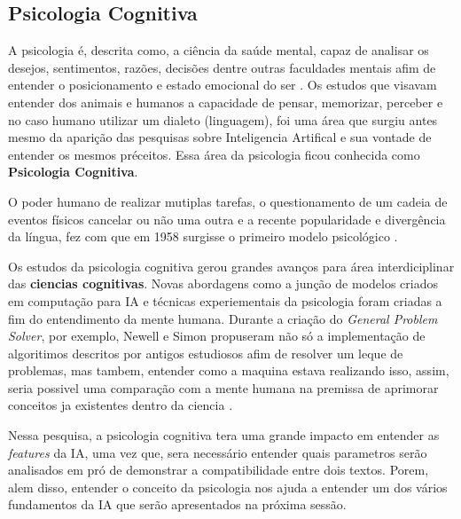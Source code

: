 \subsection{Psicologia Cognitiva}
A psicologia é, descrita como, a ciência da saúde mental, capaz de analisar os desejos, sentimentos, razões, decisões dentre outras faculdades mentais afim de entender o posicionamento e estado emocional do ser \cite[4-6]{william1890principles}. Os estudos que visavam entender dos animais e humanos a capacidade de pensar, memorizar, perceber e no caso humano utilizar um dialeto (linguagem), foi uma área que surgiu antes mesmo da aparição das pesquisas sobre Inteligencia Artifical e sua vontade de entender os mesmos préceitos. Essa área da psicologia ficou conhecida como \textbf{Psicologia Cognitiva}.

O poder humano de realizar mutiplas tarefas, o questionamento de um cadeia de eventos físicos cancelar ou não uma outra e a recente popularidade e divergência da língua, fez com que em 1958 surgisse o primeiro modelo psicológico \cite[4-7]{broadbent1958perception}.

Os estudos da psicologia cognitiva gerou grandes avanços para área interdiciplinar das \textbf{ciencias cognitivas}. Novas abordagens como a junção de modelos criados em computação para IA e técnicas experiementais da psicologia foram criadas a fim do entendimento da mente humana. Durante a criação do \textit{General Problem Solver}, por exemplo, Newell e Simon propuseram não só a implementação de algoritimos descritos por antigos estudiosos afim de resolver um leque de problemas, mas tambem, entender como a maquina estava realizando isso, assim, seria possivel uma comparação com a mente humana na premissa de aprimorar conceitos ja existentes dentro da ciencia \cite[3-5]{newell1961gps, russell2003artificial}.

Nessa pesquisa, a psicologia cognitiva tera uma grande impacto em entender as \textit{features} da IA, uma vez que, sera necessário entender quais parametros serão analisados em pró de demonstrar a compatibilidade entre dois textos. Porem, alem disso, entender o conceito da psicologia nos ajuda a entender um dos vários fundamentos da IA que serão apresentados na próxima sessão.